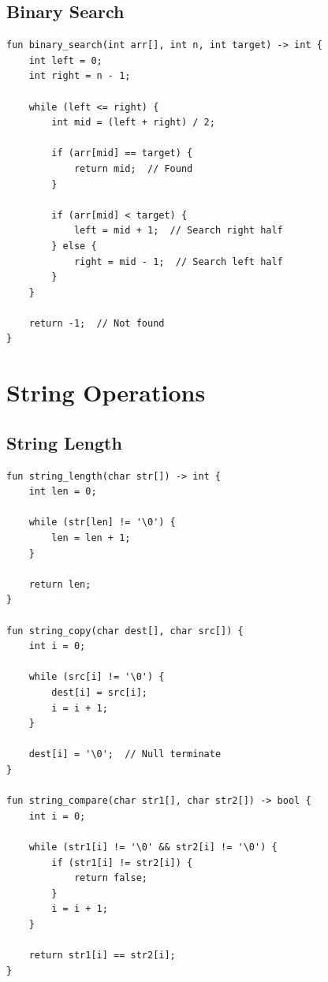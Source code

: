 \documentclass[12pt,a4paper,oneside]{book}
\begin{document}
\subsection{Binary Search}

\begin{lstlisting}[style=algo, caption={Binary Search (Requires Sorted Array)}]
fun binary_search(int arr[], int n, int target) -> int {
    int left = 0;
    int right = n - 1;
    
    while (left <= right) {
        int mid = (left + right) / 2;
        
        if (arr[mid] == target) {
            return mid;  // Found
        }
        
        if (arr[mid] < target) {
            left = mid + 1;  // Search right half
        } else {
            right = mid - 1;  // Search left half
        }
    }
    
    return -1;  // Not found
}
\end{lstlisting}

\section{String Operations}

\subsection{String Length}

\begin{lstlisting}[style=algo, caption={String Functions}]
fun string_length(char str[]) -> int {
    int len = 0;
    
    while (str[len] != '\0') {
        len = len + 1;
    }
    
    return len;
}

fun string_copy(char dest[], char src[]) {
    int i = 0;
    
    while (src[i] != '\0') {
        dest[i] = src[i];
        i = i + 1;
    }
    
    dest[i] = '\0';  // Null terminate
}

fun string_compare(char str1[], char str2[]) -> bool {
    int i = 0;
    
    while (str1[i] != '\0' && str2[i] != '\0') {
        if (str1[i] != str2[i]) {
            return false;
        }
        i = i + 1;
    }
    
    return str1[i] == str2[i];
}
\end{lstlisting}
\end{document}
